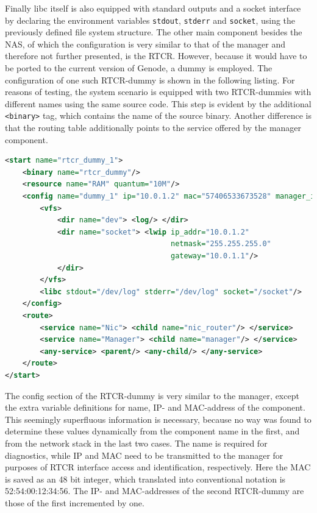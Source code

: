 Finally libc itself is also equipped with standard outputs and a socket interface by declaring the environment variables \verb|stdout|, \verb|stderr| and \verb|socket|, using the previously defined file system structure. \cite{vfs_basics} \cite{vfs_networking}
\newline \newline
The other main component besides the NAS, of which the configuration is very similar to that of the manager and therefore not further presented, is the RTCR. However, because it would have to be ported to the current version of Genode, a dummy is employed. The configuration of one such RTCR-dummy is shown in the following listing. For reasons of testing, the system scenario is equipped with two RTCR-dummies with different names using the same source code. This step is evident by the additional \verb|<binary>| tag, which contains the name of the source binary. Another difference is that the routing table additionally points to the service offered by the manager component.
\begin{lstlisting}[language=XML, caption={Configuration of one of the two RTCR-dummy components.}]
<start name="rtcr_dummy_1">
    <binary name="rtcr_dummy"/>
    <resource name="RAM" quantum="10M"/>
    <config name="dummy_1" ip="10.0.1.2" mac="57406533673528" manager_ip="10.0.0.2" manager_port="1024" info_port="1025" migr_port="1026">
        <vfs>
            <dir name="dev"> <log/> </dir>
            <dir name="socket"> <lwip ip_addr="10.0.1.2"
                                      netmask="255.255.255.0"
                                      gateway="10.0.1.1"/>
            </dir>
        </vfs>
        <libc stdout="/dev/log" stderr="/dev/log" socket="/socket"/>
    </config>
    <route>
		<service name="Nic"> <child name="nic_router"/> </service>
	    <service name="Manager"> <child name="manager"/> </service>
		<any-service> <parent/> <any-child/> </any-service>
	</route>
</start>
\end{lstlisting}
The config section of the RTCR-dummy is very similar to the manager, except the extra variable definitions for name, IP- and MAC-address of the component. This seemingly superfluous information is necessary, because no way was found to determine these values dynamically from the component name in the first, and from the network stack in the last two cases. The name is required for diagnostics, while IP and MAC need to be transmitted to the manager for purposes of RTCR interface access and identification, respectively. Here the MAC is saved as an 48 bit integer, which translated into conventional notation is 52:54:00:12:34:56. The IP- and MAC-addresses of the second RTCR-dummy are those of the first incremented by one.
